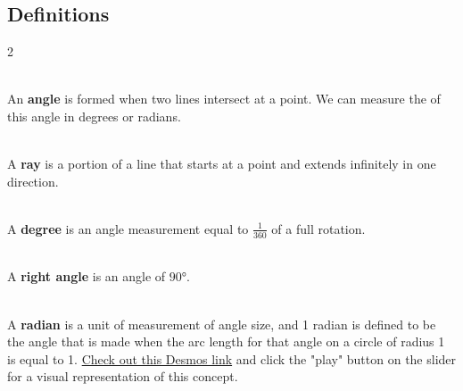 \subsection*{Definitions} \label{definitions-section-angles}
\begin{multicols}{2}
	\begin{myDefinition}[{Angle}]~\\[0.5mm]
		An \textbf{angle} is formed when two lines intersect at a point. We can measure the  of this angle in degrees or radians.
	\end{myDefinition}
	\begin{myDefinition}[{Ray}]~\\[0.5mm]
		A \textbf{ray} is a portion of a line that starts at a point and extends infinitely in one direction.
	\end{myDefinition}
	\begin{myDefinition}[{Degree}]~\\[0.5mm]
		A \textbf{degree} is an angle measurement equal to $\frac{1}{360}$ of a full rotation.
	\end{myDefinition}
	\begin{myDefinition}~\\[0.5mm]
		 A \textbf{right angle} is an angle of $\ang{90}$.
	\end{myDefinition}
	\begin{myDefinition}[{Radian}]~\\[0.5mm]
			A \textbf{radian} is a unit of measurement of angle size, and 1 radian is defined to be the angle that is made when the arc length for that angle on a circle of radius 1 is equal to 1. \href{http://tiny.cc/radian-definition}{Check out this Desmos link} and click the "play" button on the slider for a visual representation of this concept. 
	\end{myDefinition}

	\begin{center}
		\captionsetup{type=figure} 
\end{center}
\end{multicols}
